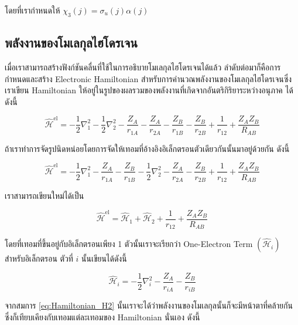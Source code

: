 \noindent โดยที่เรากำหนดให้ $\chi_3(j) = \sigma_u(j) \alpha(j)$

\subsection{พลังงานของโมเลกุลไฮโดรเจน}

เมื่อเราสามารถสร้างฟังก์ชันคลื่นที่ใช้ในการอธิบายโมเลกุลไฮโดรเจนได้แล้ว ลำดับต่อมาก็คือการกำหนดและสร้าง Electronic Hamiltonian
สำหรับการคำนวณพลังงานของโมเลกุลไฮโดรเจนซึ่งเราเขียน Hamiltonian ให้อยู่ในรูปของผลรวมของพลังงานที่เกิดจากอันตริกิริยาระหว่างอนุภาค%
ได้ดังนี้

\begin{equation}
    \label{eq:Hamiltonian_H2}
    \hat{\mathscr{H}}^{\mathrm{el}}
    =
    -\frac{1}{2} \nabla_1^2
    -\frac{1}{2} \nabla_2^2
    -\frac{Z_A}{r_{1 A}}
    -\frac{Z_A}{r_{2 A}}
    -\frac{Z_B}{r_{1 B}}
    -\frac{Z_B}{r_{2 B}}
    +\frac{1}{r_{12}}
    +\frac{Z_A Z_B}{R_{A B}}
\end{equation}

\noindent ถ้าเราทำการจัดรูปนิดหน่อยโดยการจัดให้เทอมที่อ้างอิงอิเล็กตรอนตัวเดียวกันนั้นมาอยู่ด้วยกัน ดังนี้

\begin{equation}
    \hat{\mathscr{H}}^{\mathrm{el}}
    =
    -\frac{1}{2} \nabla_1^2
    -\frac{Z_A}{r_{1 A}}
    -\frac{Z_B}{r_{1 B}}
    -\frac{1}{2} \nabla_2^2
    -\frac{Z_A}{r_{2 A}}
    -\frac{Z_B}{r_{2 B}}
    +\frac{1}{r_{12}}
    +\frac{Z_A Z_B}{R_{A B}}
\end{equation}

\noindent เราสามารถเขียนใหม่ได้เป็น

\begin{equation}
    \label{eq:Hamiltonian_H2_simple}
    \hat{\mathscr{H}}^{\mathrm{el}}
    =
    \hat{\mathscr{H}}_1
    + \hat{\mathscr{H}}_2
    + \frac{1}{r_{12}}
    + \frac{Z_A Z_B}{R_{A B}}
\end{equation}

\noindent โดยที่เทอมที่ขึ้นอยู่กับอิเล็กตรอนเพียง 1 ตัวนั้นเราจะเรียกว่า One-Electron Term $(\hat{\mathscr{H}}_i)$ สำหรับอิเล็กตรอน%
ตัวที่ $i$ นั้นเขียนได้ดังนี้

\begin{equation}
    \hat{\mathscr{H}}_i
    =
    -\frac{1}{2} \nabla_i^2
    -\frac{Z_A}{r_{i A}}
    -\frac{Z_B}{r_{i B}}
\end{equation}

จากสมการ \eqref{eq:Hamiltonian_H2} นั้นเราจะได้ว่าพลังงานของโมเลกุลนั้นก็จะมีหน้าตาที่คล้ายกันซึ่งก็เทียบเคียงกับเทอมแต่ละเทอมของ
Hamiltonian นั่นเอง ดังนี้

